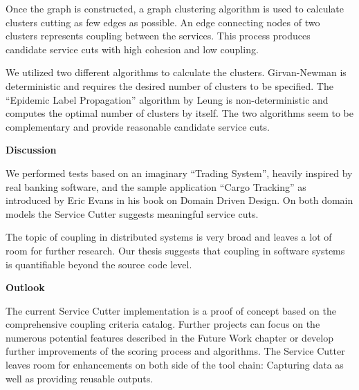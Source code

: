 Once the graph is constructed, a graph clustering algorithm is used to calculate clusters cutting as few edges as possible. An edge connecting nodes of two clusters represents coupling between the services. This process produces candidate service cuts with high cohesion and low coupling.

We utilized two different algorithms to calculate the clusters. Girvan-Newman is deterministic and requires the desired number of clusters to be specified. The \enquote{Epidemic Label Propagation} algorithm by Leung is non-deterministic and computes the optimal number of clusters by itself. The two algorithms seem to be complementary and provide reasonable candidate service cuts. 

\textbf{Discussion}

We performed tests based on an imaginary \enquote{Trading System}, heavily inspired by real banking software, and the sample application \enquote{Cargo Tracking} as introduced by Eric Evans in his book on Domain Driven Design. On both domain models the Service Cutter suggests meaningful service cuts.

The topic of coupling in distributed systems is very broad and leaves a lot of room for further research. Our thesis suggests that coupling in software systems is quantifiable beyond the source code level.

\textbf{Outlook}

The current Service Cutter implementation is a proof of concept based on the comprehensive coupling criteria catalog. Further projects can focus on the numerous potential features described in the Future Work chapter or develop further improvements of the scoring process and algorithms. The Service Cutter leaves room for enhancements on both side of the tool chain: Capturing data as well as providing reusable outputs.
